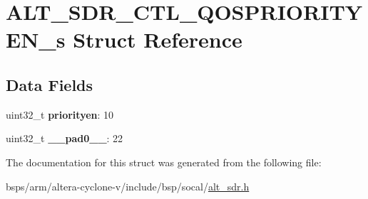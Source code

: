 \hypertarget{structALT__SDR__CTL__QOSPRIORITYEN__s}{}\section{A\+L\+T\+\_\+\+S\+D\+R\+\_\+\+C\+T\+L\+\_\+\+Q\+O\+S\+P\+R\+I\+O\+R\+I\+T\+Y\+E\+N\+\_\+s Struct Reference}
\label{structALT__SDR__CTL__QOSPRIORITYEN__s}
\subsection*{Data Fields}
\begin{DoxyCompactItemize}
\item 
\mbox{\label{structALT__SDR__CTL__QOSPRIORITYEN__s_aee909743ff0263cf38608799291689c6}} 
uint32\+\_\+t {\bfseries priorityen}\+: 10
\item 
\mbox{\label{structALT__SDR__CTL__QOSPRIORITYEN__s_a4179e789a8279f27f28d96fd0cd3bffc}} 
uint32\+\_\+t {\bfseries \+\_\+\+\_\+pad0\+\_\+\+\_\+}\+: 22
\end{DoxyCompactItemize}


The documentation for this struct was generated from the following file\+:\begin{DoxyCompactItemize}
\item 
bsps/arm/altera-\/cyclone-\/v/include/bsp/socal/\mbox{\hyperlink{alt__sdr_8h}{alt\+\_\+sdr.\+h}}\end{DoxyCompactItemize}
